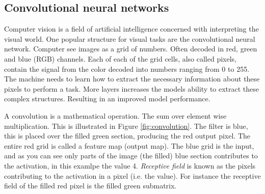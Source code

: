 \documentclass{article}
\begin{document}
\subsection{Convolutional neural networks} \label{sec:convolutional neural network}
Computer vision is a field of artificial intelligence concerned with interpreting the visual world. One popular structure for visual tasks are the convolutional neural network. %
Computer see images as a grid of numbers. Often decoded in red, green and blue (RGB) channels. Each of each of the grid cells, also called pixels, contain the signal from the color decoded into numbers ranging from 0 to 255. The machine needs to learn how to extract the necessary information about these pixels to perform a task. More layers increases the models ability to extract these complex structures. Resulting in an improved model performance. 

A convolution is a mathematical operation. The sum over element wise multiplication. This is illustrated in Figure \ref{fig:convolution}. The filter is blue, this is placed over the filled green section, producing the red output pixel. The entire red grid is called a feature map (output map). The blue grid is the input, and as you can see only parts of the image (the filled) blue section contributes to the activation, in this examlpe the value 4. \textit{Receptive field} is known as the pixels contributing to the activation in a pixel (i.e. the value). For instance the receptive field of the filled red pixel is the filled green submatrix.
\end{document}
